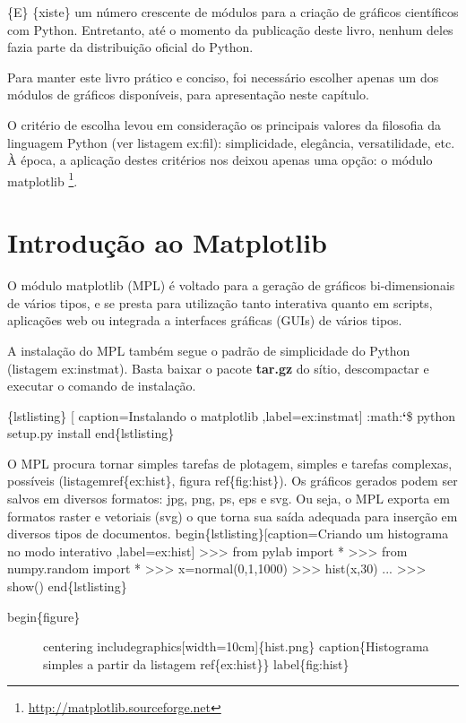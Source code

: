 \documentclass[a4paper,10pt,portuguese]{sphinxmanual}
\begin{document}
\{E\} \{xiste\} um número crescente de módulos para a criação de
gráficos científicos com Python. Entretanto, até o momento da
publicação deste livro, nenhum deles fazia parte da distribuição
oficial do Python.

Para manter este livro prático e conciso, foi necessário escolher
apenas um dos módulos de gráficos disponíveis, para apresentação
neste capítulo.

O critério de escolha levou em consideração os principais valores
da filosofia da linguagem Python (ver listagem ex:fil):
simplicidade, elegância, versatilidade, etc. À época, a aplicação
destes critérios nos deixou apenas uma opção: o módulo
matplotlib \footnote{
\href{http://matplotlib.sourceforge.net}{http://matplotlib.sourceforge.net}
}.


\chapter{Introdução ao Matplotlib}
\label{Capplot:introducao-ao-matplotlib}\label{Capplot::doc}
O módulo matplotlib (MPL) é voltado para a geração de gráficos
bi-dimensionais de vários tipos, e se presta para utilização tanto
interativa quanto em scripts, aplicações web ou integrada a
interfaces gráficas (GUIs) de vários tipos.

A instalação do MPL também segue o padrão de simplicidade do Python
(listagem ex:instmat). Basta baixar o pacote \textbf{tar.gz} do sítio,
descompactar e executar o comando de instalação.

\{lstlisting\} {[} caption=Instalando o matplotlib ,label=ex:instmat{]}
:math:{\color{red}\bfseries{}{}`}\$ python setup.py install
end\{lstlisting\}

O MPL procura tornar simples tarefas de plotagem, simples e tarefas complexas, possíveis (listagemref\{ex:hist\}, figura ref\{fig:hist\}). Os gráficos gerados podem ser salvos em diversos formatos: jpg, png, ps, eps e svg. Ou seja, o MPL exporta em formatos raster e vetoriais (svg) o que torna sua saída adequada para inserção em diversos tipos de documentos.
begin\{lstlisting\}{[}caption=Criando um histograma no modo interativo ,label=ex:hist{]}
\textgreater{}\textgreater{}\textgreater{} from pylab import *
\textgreater{}\textgreater{}\textgreater{} from numpy.random import *
\textgreater{}\textgreater{}\textgreater{} x=normal(0,1,1000)
\textgreater{}\textgreater{}\textgreater{} hist(x,30)
...
\textgreater{}\textgreater{}\textgreater{} show()
end\{lstlisting\}
\begin{description}
\item[{begin\{figure\}}] \leavevmode
centering
includegraphics{[}width=10cm{]}\{hist.png\}
caption\{Histograma simples a partir da listagem ref\{ex:hist\}\}
label\{fig:hist\}

\end{description}
\end{document}
